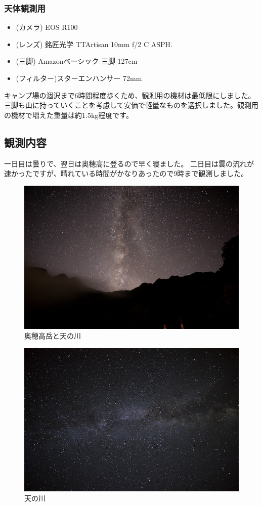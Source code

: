 \documentclass[../main]{subfiles}
\begin{document}
\subsubsection{天体観測用}

\begin{itemize}
  \item (カメラ) EOS R100
  \item (レンズ) 銘匠光学 TTArtisan 10mm f/2 C ASPH.
  \item (三脚) Amazonベーシック 三脚 127cm
  \item (フィルター)スターエンハンサー 72mm
\end{itemize}

キャンプ場の涸沢まで6時間程度歩くため、観測用の機材は最低限にしました。三脚も山に持っていくことを考慮して安価で軽量なものを選択しました。観測用の機材で増えた重量は約1.5kg程度です。

\subsection{観測内容}
一日目は曇りで、翌日は奥穂高に登るので早く寝ました。
二日目は雲の流れが速かったですが、晴れている時間がかなりあったので9時まで観測しました。\\

\begin{figure}[H]
  \centering
  \includegraphics[width=0.7\linewidth]{sections/mori/IMG_2378.jpg}
  \caption{奥穂高岳と天の川}
\end{figure}

\begin{figure}[H]
  \centering
  \includegraphics[width=0.7\linewidth]{sections/mori/amanogawa_okuhotaka_busiyou.jpg}
  \caption{天の川}
\end{figure}
\end{document}
